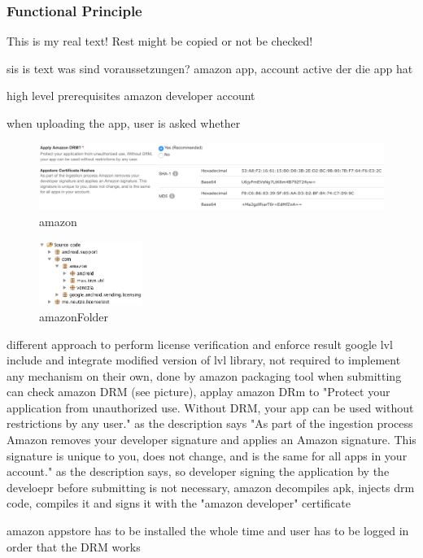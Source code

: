\subsubsection{Functional Principle}\label{subsection:license-amazon-functional}
This is my real text! Rest might be copied or not be checked!

sis is text
was sind voraussetzungen? amazon app, account active der die app hat\newline

high level prerequisites
amazon developer account

when uploading the app, user is asked whether
\begin{figure}[h]
    \centering
    \includegraphics[width=1\textwidth]{data/amazon.png}
    \caption{amazon}
    \label{fig:amazon}
\end{figure}

\begin{figure}[h]
    \centering
    \includegraphics[width=0.3\textwidth]{data/amazonFolder.png}
    \caption{amazonFolder}
    \label{fig:amazonFolder}
\end{figure}

%
different approach to perform license verification and enforce result
google lvl include and integrate modified version of lvl library, not required to implement any mechanism on their own, done by amazon packaging tool
when submitting can check amazon DRM (see picture), applay amazon DRm to "Protect your application from unauthorized use. Without DRM, your app can be used without restrictions by any user." as the description says
"As part of the ingestion process Amazon removes your developer signature and applies an Amazon signature. This signature is unique to you, does not change, and is the same for all apps in your account."  as the description says, so developer signing the application by the develoepr before submitting is not necessary, amazon decompiles apk, injects drm code, compiles it and signs it with the "amazon developer" certificate
\cite{munteanLicense}
%

amazon appstore has to be installed the whole time and user has to be logged in order that the DRM works

